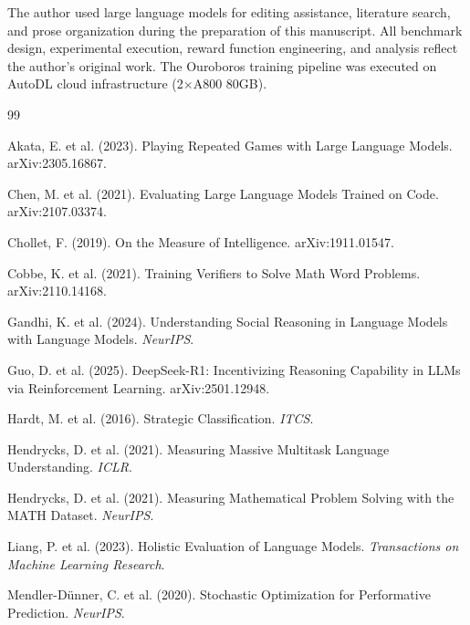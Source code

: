\documentclass{article}
\begin{document}
The author used large language models for editing assistance, literature search, and prose organization during the preparation of this manuscript. All benchmark design, experimental execution, reward function engineering, and analysis reflect the author's original work. The Ouroboros training pipeline was executed on AutoDL cloud infrastructure (2$\times$A800 80GB).




\begin{thebibliography}{99}

Akata, E. et al. (2023).
Playing Repeated Games with Large Language Models.
arXiv:2305.16867.

Chen, M. et al. (2021).
Evaluating Large Language Models Trained on Code.
arXiv:2107.03374.

Chollet, F. (2019).
On the Measure of Intelligence.
arXiv:1911.01547.

Cobbe, K. et al. (2021).
Training Verifiers to Solve Math Word Problems.
arXiv:2110.14168.

Gandhi, K. et al. (2024).
Understanding Social Reasoning in Language Models with Language Models.
\textit{NeurIPS}.

Guo, D. et al. (2025).
DeepSeek-R1: Incentivizing Reasoning Capability in LLMs via Reinforcement Learning.
arXiv:2501.12948.

Hardt, M. et al. (2016).
Strategic Classification.
\textit{ITCS}.

Hendrycks, D. et al. (2021).
Measuring Massive Multitask Language Understanding.
\textit{ICLR}.

Hendrycks, D. et al. (2021).
Measuring Mathematical Problem Solving with the MATH Dataset.
\textit{NeurIPS}.

Liang, P. et al. (2023).
Holistic Evaluation of Language Models.
\textit{Transactions on Machine Learning Research}.

Mendler-D\"{u}nner, C. et al. (2020).
Stochastic Optimization for Performative Prediction.
\textit{NeurIPS}.


\end{thebibliography}
\end{document}
